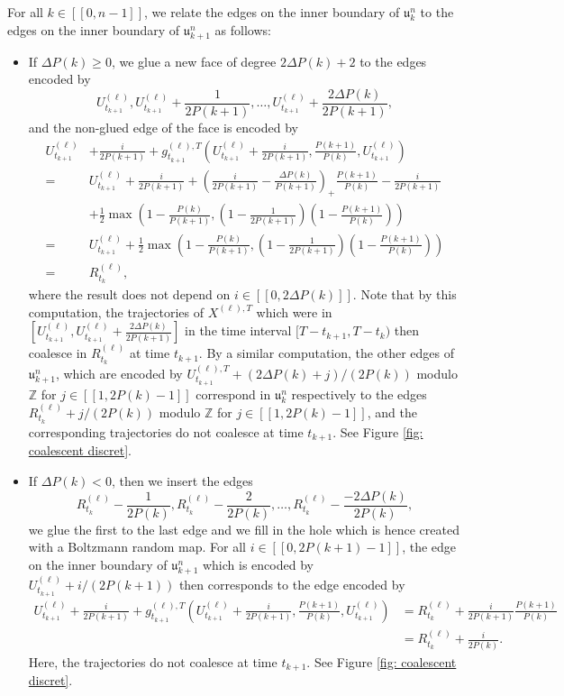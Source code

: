 \documentclass[11pt]{article}
\numberwithin{equation}{section}
\def \Z{\mathbb{Z}}
\def\lb{[\![}
\def\rb{]\!]}
\begin{document}
For all $k \in \lb 0, n-1 \rb$, we relate the edges on the inner boundary of $\mathfrak{u}^n_k$ to the edges on the inner boundary of $\mathfrak{u}^n_{k+1}$ as follows:
\begin{itemize}
	\item If $\Delta P(k)\ge 0$, we glue a new face of degree $2 \Delta P(k) +2$ to the edges encoded by
	$$
	U^{(\ell)}_{t_{k+1}}, U^{(\ell)}_{t_{k+1}} + \frac{1}{2 P(k+1)}, \ldots 
	,
	U^{(\ell)}_{t_{k+1}} + \frac{ 2 \Delta P(k)}{2P(k+1)},
	$$
	and the non-glued edge of the face is encoded by
	\begin{align*}
	U^{(\ell)}_{t_{k+1}} &+ \frac{i}{2 P(k+1)}+ g_{t_{k+1}}^{(\ell),T} \left(U^{(\ell)}_{t_{k+1}}+ \frac{i}{2 P(k+1)}, \frac{P(k+1)}{P(k)}, U^{(\ell)}_{t_{k+1}}\right) \\
	=
	&U^{(\ell)}_{t_{k+1}} + \frac{i}{2 P(k+1)} + \left( \frac{i}{2P(k+1)} - \frac{\Delta P(k)}{P(k+1)} 
	\right)_+ \frac{P(k+1)}{P(k)} - \frac{i}{2P(k+1)} \\
	&+ \frac{1}{2}
	\max\left(1- \frac{P(k)}{P(k+1)}, \left( 1 - \frac{1}{2 P(k+1)} \right)\left(1- \frac{P(k+1)}{P(k)} \right) \right)\\
	=& U^{(\ell)}_{t_{k+1}} + \frac{1}{2}\max\left(1- \frac{P(k)}{P(k+1)}, \left( 1 - \frac{1}{2 P(k+1)} \right)\left(1- \frac{P(k+1)}{P(k)} \right) \right)  \\
	=& R^{(\ell)}_{t_k},
	\end{align*}
	where the result does not depend on $i \in \lb 0, 2\Delta P(k)\rb$. Note that by this computation, the trajectories of $X^{(\ell),T}$ which were in $[U^{(\ell)}_{t_{k+1}}, U^{(\ell)}_{t_{k+1}} + \frac{ 2 \Delta P(k)}{2P(k+1)}]$ in the time interval $[T-t_{k+1}, T-t_k)$ then coalesce in $R^{(\ell)}_{t_k}$ at time $t_{k+1}$. 
	By a similar computation, the other edges of $\mathfrak{u}^n_{k+1}$, which are encoded by $U_{t_{k+1}}^{(\ell),T}+ (2\Delta P(k) + j)/(2P(k))$ modulo $\Z$ for $j \in \lb 1, 2P(k)-1 \rb$ correspond in $\mathfrak{u}^n_k$ respectively to the edges $R_{t_k}^{(\ell)}+ j/(2P(k))$ modulo $\Z$ for $j \in \lb 1, 2P(k)-1 \rb$, and the corresponding trajectories do not coalesce at time $t_{k+1}$. See Figure \ref{fig: coalescent discret}.
	\item If $\Delta P(k) <0$, then we insert the edges
	$$
	R^{(\ell)}_{t_k} - \frac{1}{2P(k)}, R^{(\ell)}_{t_k} - \frac{2}{2P(k)}, \ldots, 
	R^{(\ell)}_{t_k} - \frac{-2\Delta P(k)}{2P(k)},
	$$
	we glue the first to the last edge and we fill in the hole which is hence created with a Boltzmann random map. For all $i \in \lb 0, 2P(k+1)-1 \rb$, the edge on the inner boundary of $\mathfrak{u}^n_{k+1}$ which is encoded by $U^{(\ell)}_{t_{k+1}}  + i/(2P(k+1))$ then corresponds to the edge encoded by 
	\begin{align*}
	U^{(\ell)}_{t_{k+1}} + \frac{i}{2 P(k+1)}+ g_{t_{k+1}}^{(\ell),T} \left(U^{(\ell)}_{t_{k+1}}+ \frac{i}{2 P(k+1)}, \frac{P(k+1)}{P(k)}, U^{(\ell)}_{t_{k+1}}\right)
	&= R^{(\ell)}_{t_k} + \frac{i}{2P(k+1)} \frac{P(k+1)}{P(k)} \\
	&= R^{(\ell)}_{t_k} + \frac{i}{2P(k)} .
	\end{align*}
	Here, the trajectories do not coalesce at time $t_{k+1}$. See Figure \ref{fig: coalescent discret}.
\end{itemize}
\end{document}
